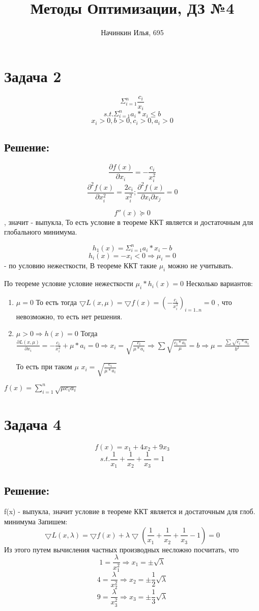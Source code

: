 \documentclass[a4paper]{article}
\title{Методы Оптимизации, ДЗ №4}
\author{Начинкин Илья, 695}
\begin{document}
\maketitle

\section*{Задача 2}
$$\Sigma_{i=1}^{n}\frac{c_i}{x_i}$$
$$ s.t. \Sigma_{i=1}^{n}a_i*x_i \leq b $$
$$x_i > 0, b > 0, c_i > 0, a_i > 0 $$
\subsection*{Решение:}

$$\frac{\partial f(x)}{\partial x_i} = -\frac{c_i}{x_i^2}$$
$$\frac{\partial^2 f(x)}{\partial x_i^2} = \frac{2c_i}{x_i^2} ; \frac{\partial^2 f(x)}{\partial x_i \partial x_j}=0$$

$$f''(x) \succeq 0 $$, значит - выпукла, То есть условие в теореме ККТ является и достаточным для глобального минимума.

$$h_1(x) = \Sigma_{i=1}^{n}a_i*x_i - b$$
$$h_i(x) = -x_i < 0 \Longrightarrow \mu_i = 0$$ - по условию нежесткости, В теореме ККТ такие $\mu_i$  можно не учитывать.

По теореме условие условие нежесткости $\mu_i*h_i(x) = 0$
Несколько вариантов:

\begin{enumerate}
    \item $\mu = 0$
    То есть тогда $\bigtriangledown L(x, \mu) = \bigtriangledown f(x)  = (-\frac{c_i}{x_i^2})_{i=1..n} = 0$ , что невозможно, то есть нет решения.
    \item $\mu > 0 \Longrightarrow h(x) = 0$
    Тогда $\frac{\partial L(x, \mu)}{\partial x_i} = -\frac{c_i}{x_i^2} + \mu*a_i = 0 \Longrightarrow x_i = \sqrt{\frac{c_i}{\mu*a_i}} \Longrightarrow \sum\sqrt{\frac{c_i*a_i}{\mu}} = b \Longrightarrow \mu = \frac{\sum\sqrt{c_i*a_i}}{b^2}$
    
    То есть при таком $\mu$ $x_i = \sqrt{\frac{c_i}{\mu*a_i}}$
    
\end{enumerate}

$f(x) = \sum_{i=1}^{n}\sqrt{\mu c_i a_i}$ 
\section*{Задача 4}
$$ f(x) = x_1 + 4x_2 + 9x_3 $$
$$s.t. \frac{1}{x_1} + \frac{1}{x_2} + \frac{1}{x_3} = 1 
$$ 
\subsection*{Решение:}
f(x) - выпукла, значит условие в теореме ККТ является и достаточным для глоб. минимума 
Запишем:
$$\bigtriangledown L(x, \lambda) = \bigtriangledown f(x) + \lambda \bigtriangledown (\frac{1}{x_1} + \frac{1}{x_2} + \frac{1}{x_3} - 1) = 0$$
Из этого путем вычисления частных производных несложно посчитать, что
$$1 = \frac{\lambda}{x_1^2} \Longrightarrow x_1 = \pm \sqrt{\lambda}$$
$$4 = \frac{\lambda}{x_2^2} \Longrightarrow x_2 = \pm \frac{1}{2} \sqrt{\lambda}$$
$$9 = \frac{\lambda}{x_3^2} \Longrightarrow x_3 = \pm \frac{1}{3} \sqrt{\lambda}$$
\end{document}
